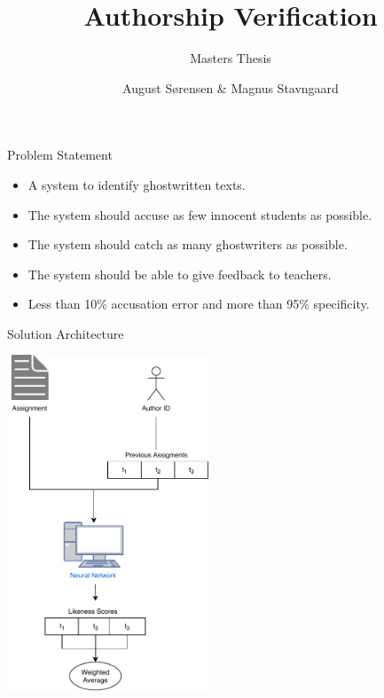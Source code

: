 \documentclass[10pt]{beamer}
\title{Authorship Verification}
\subtitle{Masters Thesis}
\date{}
\author{August S\o rensen \& Magnus Stavngaard}
\institute{University of Copenhagen}
\begin{document}
\maketitle

\begin{frame}[fragile]{Problem Statement}
    \begin{itemize}
        \item A system to identify ghostwritten texts.
        \item The system should accuse as few innocent students as possible.
        \item The system should catch as many ghostwriters as possible.
        \item The system should be able to give feedback to teachers.
        \item Less than 10\% accusation error and more than 95\% specificity.
    \end{itemize}
\end{frame}

\begin{frame}[fragile]{Solution Architecture}
    \begin{center}
        \includegraphics[width=0.45\textwidth]{../../macom/summary/pictures/Model}
    \end{center}
\end{frame}
\end{document}
